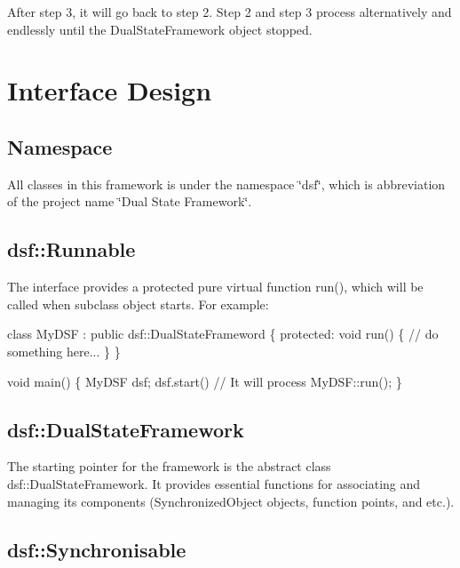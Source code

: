 After step 3, it will go back to step 2. Step 2 and step 3 process alternatively and endlessly until the Dual\+State\+Framework object stopped.\hypertarget{_framework_design_FrameworkDesignInterfaceDesign}{}\section{Interface Design}\label{_framework_design_FrameworkDesignInterfaceDesign}
\hypertarget{_framework_design_FrameworkDesignInterfaceDesignNamespace}{}\subsection{Namespace}\label{_framework_design_FrameworkDesignInterfaceDesignNamespace}
All classes in this framework is under the namespace \char`\"{}dsf\char`\"{}, which is abbreviation of the project name \char`\"{}\+Dual State Framework\char`\"{}.\hypertarget{_framework_design_FrameworkDesignInterfaceDesigndsfRunnable}{}\subsection{dsf\+::\+Runnable}\label{_framework_design_FrameworkDesignInterfaceDesigndsfRunnable}
The interface provides a protected pure virtual function run(), which will be called when subclass object starts. For example\+: 
\begin{DoxyCode}
\textcolor{keyword}{class }MyDSF : \textcolor{keyword}{public} dsf::DualStateFrameword
\{
\textcolor{keyword}{protected}:
    \textcolor{keywordtype}{void} run()
    \{
        \textcolor{comment}{// do something here...}
    \}
\}

\textcolor{keywordtype}{void} main()
\{
    MyDSF dsf;
    dsf.start() \textcolor{comment}{// It will process MyDSF::run();}
\}
\end{DoxyCode}
\hypertarget{_framework_design_FrameworkDesignInterfacedsfDualStateFramework}{}\subsection{dsf\+::\+Dual\+State\+Framework}\label{_framework_design_FrameworkDesignInterfacedsfDualStateFramework}
The starting pointer for the framework is the abstract class dsf\+::\+Dual\+State\+Framework. It provides essential functions for associating and managing its components (Synchronized\+Object objects, function points, and etc.).\hypertarget{_framework_design_FrameworkDesignInterfacedsfSynchronisable}{}\subsection{dsf\+::\+Synchronisable}\label{_framework_design_FrameworkDesignInterfacedsfSynchronisable}
